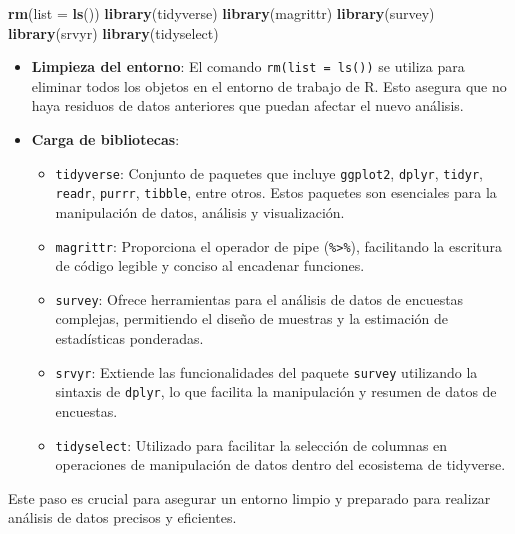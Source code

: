\documentclass[
  12pt,
]{book}
\newenvironment{Shaded}{\begin{snugshade}}{\end{snugshade}}
\newcommand{\AttributeTok}[1]{\textcolor[rgb]{0.13,0.29,0.53}{#1}}
\newcommand{\FunctionTok}[1]{\textcolor[rgb]{0.13,0.29,0.53}{\textbf{#1}}}
\newcommand{\NormalTok}[1]{#1}
\providecommand{\tightlist}{%
  \setlength{\itemsep}{0pt}\setlength{\parskip}{0pt}}
\begin{document}
\begin{Shaded}
\begin{Highlighting}[]
   \FunctionTok{rm}\NormalTok{(}\AttributeTok{list =} \FunctionTok{ls}\NormalTok{())}
   \FunctionTok{library}\NormalTok{(tidyverse)}
   \FunctionTok{library}\NormalTok{(magrittr)}
   \FunctionTok{library}\NormalTok{(survey)}
   \FunctionTok{library}\NormalTok{(srvyr)}
   \FunctionTok{library}\NormalTok{(tidyselect)}
\end{Highlighting}
\end{Shaded}

\begin{itemize}
\tightlist
\item
  \textbf{Limpieza del entorno}: El comando \texttt{rm(list\ =\ ls())} se utiliza para eliminar todos los objetos en el entorno de trabajo de R. Esto asegura que no haya residuos de datos anteriores que puedan afectar el nuevo análisis.
\item
  \textbf{Carga de bibliotecas}:

  \begin{itemize}
  \tightlist
  \item
    \texttt{tidyverse}: Conjunto de paquetes que incluye \texttt{ggplot2}, \texttt{dplyr}, \texttt{tidyr}, \texttt{readr}, \texttt{purrr}, \texttt{tibble}, entre otros. Estos paquetes son esenciales para la manipulación de datos, análisis y visualización.
  \item
    \texttt{magrittr}: Proporciona el operador de pipe (\texttt{\%\textgreater{}\%}), facilitando la escritura de código legible y conciso al encadenar funciones.
  \item
    \texttt{survey}: Ofrece herramientas para el análisis de datos de encuestas complejas, permitiendo el diseño de muestras y la estimación de estadísticas ponderadas.
  \item
    \texttt{srvyr}: Extiende las funcionalidades del paquete \texttt{survey} utilizando la sintaxis de \texttt{dplyr}, lo que facilita la manipulación y resumen de datos de encuestas.
  \item
    \texttt{tidyselect}: Utilizado para facilitar la selección de columnas en operaciones de manipulación de datos dentro del ecosistema de tidyverse.
  \end{itemize}
\end{itemize}

Este paso es crucial para asegurar un entorno limpio y preparado para realizar análisis de datos precisos y eficientes.
\end{document}
